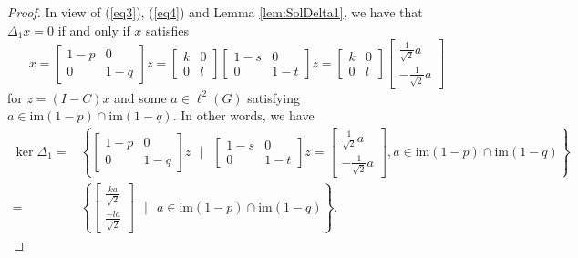 \documentclass[a4paper,leqno,12pt]{article}
\numberwithin{equation}{section}
\theoremstyle{plain}
\theoremstyle{definition}
\theoremstyle{remark}
\begin{document}
	\begin{proof}
		In view of (\ref{eq3}), (\ref{eq4}) and Lemma \ref{lem:SolDelta1}, we have that $\Delta_1 x=0$ if and only if $x$ satisfies  
		\[
			x
			=
			\begin{bmatrix}1-p & 0 \\ 0 & 1-q\end{bmatrix}z
			= 
			\begin{bmatrix}k & 0 \\ 0 & l\end{bmatrix}
			\begin{bmatrix}1-s & 0 \\ 0 & 1-t \end{bmatrix}
			z
			=
			\begin{bmatrix}k & 0 \\ 0 & l\end{bmatrix}
			\begin{bmatrix}\frac{1}{\sqrt 2}a \\-\frac{1}{\sqrt 2}a
			\end{bmatrix} 
		\]
		for $z=(I-C)x$ and some $a\in \ell^2(G)$ satisfying $a\in\mathrm{im}(1-p)\cap\mathrm{im}(1-q)$.
		In other words, we have
		\begin{align*}
			\ker\Delta_1
			=
			&
			\left\{ 	
				\begin{bmatrix}1-p & 0 \\ 0 & 1-q\end{bmatrix}z
				~~\mid~~  
				\begin{bmatrix}1-s & 0 
				\\ 
				0 & 1-t\end{bmatrix}z=\begin{bmatrix}\frac{1}{\sqrt 2}a \\-\frac{1}{\sqrt 2}a
			\end{bmatrix}, a\in\mathrm{im}(1-p)\cap\mathrm{im}(1-q)  	
		   \right\}
		   \\
			=
			&
			  \left\{ 
			  	\begin{bmatrix}\frac{ka}{\sqrt 2} \\ \frac{-la}{\sqrt 2}\end{bmatrix}
			 	 ~~\mid~~ 
			  	a\in\mathrm{im}(1-p)\cap\mathrm{im}(1-q)  
			  \right\}.
		\end{align*}

\end{proof}
\end{document}
